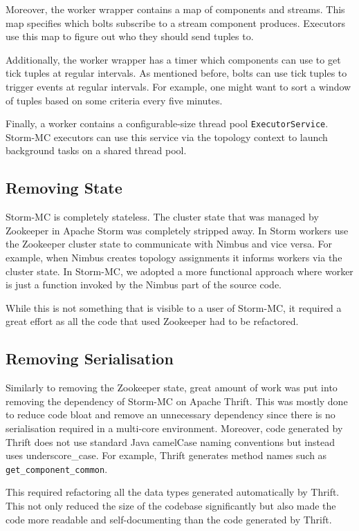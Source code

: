 Moreover, the worker wrapper contains a map of components and streams. This map specifies which bolts subscribe to a stream component produces. Executors use this map to figure out who they should send tuples to.

Additionally, the worker wrapper has a timer which components can use to get tick tuples at regular intervals. As mentioned before, bolts can use tick tuples to trigger events at regular intervals. For example, one might want to sort a window of tuples based on some criteria every five minutes.

Finally, a worker contains a configurable-size thread pool \texttt{ExecutorService}. Storm-MC executors can use this service via the topology context to launch background tasks on a shared thread pool.

\subsection{Removing State}

Storm-MC is completely stateless. The cluster state that was managed by Zookeeper in Apache Storm was completely stripped away. In Storm workers use the Zookeeper cluster state to communicate with Nimbus and vice versa. For example, when Nimbus creates topology assignments it informs workers via the cluster state. In Storm-MC, we adopted a more functional approach where worker is just a function invoked by the Nimbus part of the source code.

While this is not something that is visible to a user of Storm-MC, it required a great effort as all the code that used Zookeeper had to be refactored.

\subsection{Removing Serialisation}

Similarly to removing the Zookeeper state, great amount of work was put into removing the dependency of Storm-MC on Apache Thrift. This was mostly done to reduce code bloat and remove an unnecessary dependency since there is no serialisation required in a multi-core environment. Moreover, code generated by Thrift does not use standard Java camelCase naming conventions but instead uses underscore\_case. For example, Thrift generates method names such as \\ \texttt{get\_component\_common}.

This required refactoring all the data types generated automatically by Thrift. This not only reduced the size of the codebase significantly but also made the code more readable and self-documenting than the code generated by Thrift.

